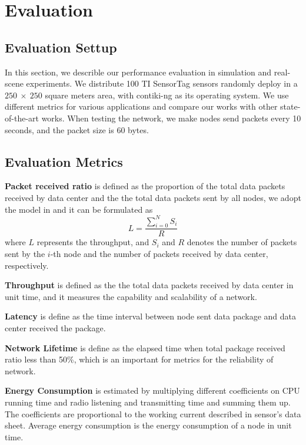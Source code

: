 \section{Evaluation}
\label{Eva}

\subsection{Evaluation Settup}
In this section, we describle our performance evaluation in simulation and
real-scene experiments. We distribute 100 TI SensorTag sensors randomly deploy in a
$250~\times~250$ square meters area, with contiki-ng as its operating system. We
use different metrics for various applications and compare our works with other
state-of-the-art works. When testing the network, we make nodes send packets
every 10 seconds, and the packet size is 60 bytes.

\subsection{Evaluation Metrics}

\textbf{Packet received ratio} is defined as the proportion of the total data
packets received by data center and the the total data packets sent by all nodes, 
we adopt the model in \cite{chen2017energy}
and it can be formulated as
\begin{equation}
	L = \frac{\sum_{i = 0}^{N}S_i}{R}
\end{equation}
where $L$ represents the throughput, and $S_i$ and $R$ denotes the number of
packets sent by the $i$-th node and the number of packets received by data
center, respectively.

\textbf{Throughput} is defined as the the total data packets received by data
center in unit time, and it measures the capability and scalability of a network.

\textbf{Latency} is define as the time interval between node sent data package and
data center received the package.

\textbf{Network Lifetime} is define as the elapsed time when total package received
ratio less than 50\%, which is an important for metrics for the reliability of network.

\textbf{Energy Consumption} is estimated by multiplying different coefficients on
CPU running time and radio listening and transmitting time and summing them up.
The coefficients are proportional to the working current described in sensor's
data sheet. Average energy consumption is the energy consumption of a node in
unit time.

